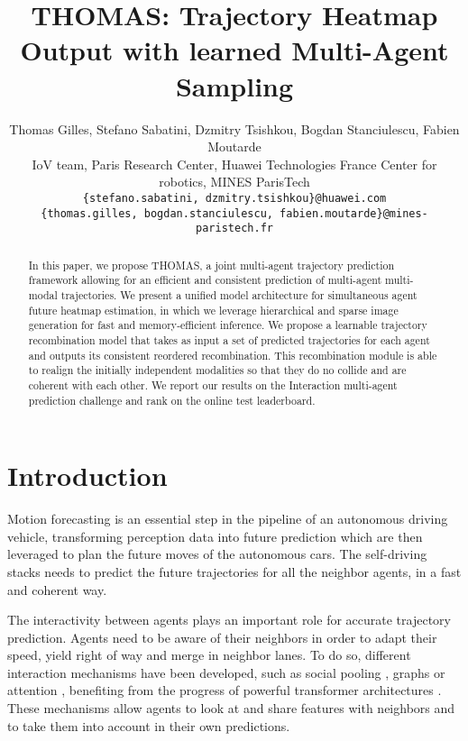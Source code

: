 \documentclass{article} \usepackage{iclr2022_conference,times}
\title{THOMAS: Trajectory Heatmap Output with learned Multi-Agent Sampling}
\author{Thomas Gilles, Stefano Sabatini, Dzmitry Tsishkou, Bogdan Stanciulescu, Fabien Moutarde \\
IoV team, Paris Research Center, Huawei Technologies France 
Center for robotics, MINES ParisTech\\
\texttt{\{stefano.sabatini, dzmitry.tsishkou\}@huawei.com} \\
\texttt{\{thomas.gilles, bogdan.stanciulescu, fabien.moutarde\}@mines-paristech.fr} \\
}
\begin{document}
\maketitle

\begin{abstract}
In this paper, we propose THOMAS, a joint multi-agent trajectory prediction framework allowing for an efficient and consistent prediction of multi-agent multi-modal trajectories. We present a unified model architecture for simultaneous agent future heatmap estimation, in which we leverage hierarchical and sparse image generation for fast and memory-efficient inference. We propose a learnable trajectory recombination model that takes as input a set of predicted trajectories for each agent and outputs its consistent reordered recombination. This recombination module is able to realign the initially independent modalities so that they do no collide and are coherent with each other.  We report our results on the Interaction multi-agent prediction challenge and rank  on the online test leaderboard.
\end{abstract}

\section{Introduction}

Motion forecasting is an essential step in the pipeline of an autonomous driving vehicle, transforming perception data into future prediction which are then leveraged to plan the future moves of the autonomous cars. The self-driving stacks needs to predict the future trajectories for all the neighbor agents, in a fast and coherent way.

The interactivity between agents plays an important role for accurate trajectory prediction. Agents need to be aware of their neighbors in order to adapt their speed, yield right of way and merge in neighbor lanes. To do so, different interaction mechanisms have been developed, such as social pooling \citep{alahi2016social, lee2017desire, deo2018convolutional}, graphs \citep{salzmann2020trajectron++, zeng2021lanercnn} or attention \citep{mercat2020multi, messaoud2020multi, luo2020probabilistic,gao2020vectornet, liang2020learning}, benefiting from the progress of powerful transformer architectures \citep{li2020end, yuan2021agentformer, girgis2021autobots, ngiam2021scene} . These mechanisms allow agents to look at and share features with neighbors and to take them into account in their own predictions.
\end{document}
